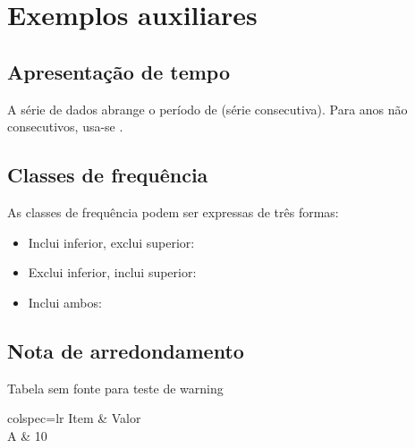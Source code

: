 \documentclass[a4paper, 12pt]{report}
\begin{document}
\chapter{Exemplos auxiliares}

\section{Apresentação de tempo}

A série de dados abrange o período de 
(série consecutiva). Para anos não consecutivos, usa-se
.

\section{Classes de frequência}

As classes de frequência podem ser expressas de três formas:
\begin{itemize}
  \item Inclui inferior, exclui superior: 
  \item Exclui inferior, inclui superior: 
  \item Inclui ambos: 
\end{itemize}

\section{Nota de arredondamento}

\abntNotaArrend

\begin{tabela}{Tabela sem fonte para teste de warning}
  \label{tab:semfonte}
  \begin{tabelaabnt}{colspec={lr}}
    Item & Valor \\
    A    & \num{10} \\
  \end{tabelaabnt}
\end{tabela}
\end{document}
